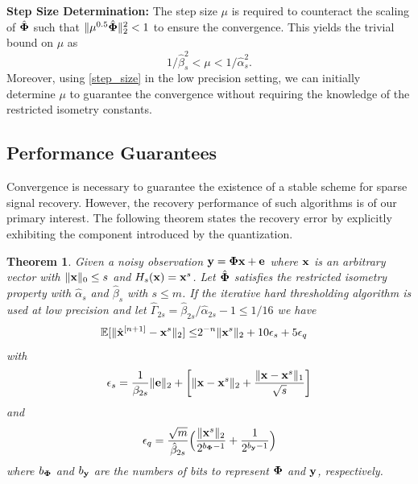 \documentclass{article}
\newtheorem{theorem}{Theorem}
\begin{document}
{\bf Step Size Determination:} The step size $\mu$ is required to counteract the scaling of $\hat{{\bf \Phi}}$ such that $\|\mu^{0.5} \hat{\bf\Phi}\|_2^2 <1$ to ensure the convergence. This yields the trivial bound on $\mu$ as
\begin{equation}
    1/\hat{\beta}_s^2 < \mu < 1/\hat{\alpha}_s^2.
\end{equation}
Moreover, using \ref{step_size} in the low precision setting, we can initially determine $\mu$ to guarantee the convergence without requiring the knowledge of the restricted isometry constants.

 \subsection{Performance Guarantees}
 Convergence is necessary to guarantee the existence of a stable scheme for sparse signal recovery. However, the recovery performance of such algorithms is of our primary interest. The following theorem states the recovery error by explicitly exhibiting the component introduced by the quantization.
\begin{theorem}\label{main_theorem_TH}
Given a noisy observation ${\bf y} = {\bf \Phi x}+{\bf e} $ where ${\bf x}$ is an arbitrary vector with $\|{\bf x} \|_0 \leq s$ and $H_s({\bf x}) = {\bf x}^s$. Let $\hat{\bf \Phi}$ satisfies the restricted isometry property with $\hat{\alpha}_s$ and $\hat{\beta}_s$ with $s\leq m$. If the iterative hard thresholding algorithm is used at low precision and let $\hat{\Gamma}_{2s} = \hat{\beta}_{2s}/\hat{\alpha}_{2s} -1 \leq 1/16$ we have
\begin{equation}\label{main_theorem}
\begin{split}
        \mathbb{E}[\|\hat{{\bf x}}^{[n+1]}-{\bf x}^s\|_2]  
        \leq &2^{-n}\|{\bf x}^{s}\|_2  + 10\epsilon_s + 5\epsilon_q
\end{split}
\end{equation}
with 
\begin{equation}
\epsilon_s = \frac{1}{\beta_{2s}}\|{\bf e} \|_2 +\bigg  [ \|{\bf x}-{\bf x}^s \|_2 + \frac{\|{\bf x}-{\bf x}^s \|_1}{\sqrt{s}}\bigg]    
\end{equation}
and
\begin{equation}
\epsilon_q = \frac{\sqrt{m}}{\hat{\beta}_{2s}}\Big ( \frac{\| {\bf x}^s\|_2}{2^{b_{\bf \Phi}-1}}+\frac{1}{2^{b_{\bf y}-1}} \Big )
\end{equation}
where $b_{\bf \Phi}$ and $b_{\bf y}$ are the numbers of bits to represent ${\bf \Phi}$ and ${\bf y}$, respectively.
\end{theorem}
\end{document}
